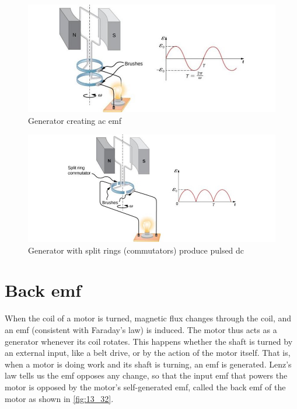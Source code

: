 \documentclass[14pt]{memoir}
\begin{document}
\begin{figure}[H]
\begin{center}
\includegraphics[scale=0.5]{fig/fig_13_29.jpg}
\caption{Generator creating ac emf}
\label{fig:13_29}
\end{center}
\end{figure}

\begin{figure}[H]
\begin{center}
\includegraphics[scale=0.5]{fig/fig_13_30.jpg}
\caption{Generator with split rings (commutators) produce pulsed dc}
\label{fig:13_30}
\end{center}
\end{figure}

\section{Back emf}

When the coil of a motor is turned, magnetic flux changes through the coil, and an emf (consistent with Faraday’s law) is induced. The motor thus acts as a generator whenever its coil rotates. This happens whether the shaft is turned by an external input, like a belt drive, or by the action of the motor itself. That is, when a motor is doing work and its shaft is turning, an emf is generated. Lenz’s law tells us the emf opposes any change, so that the input emf that powers the motor is opposed by the motor’s self-generated emf, called the back emf of the motor as shown in \ref{fig:13_32}.
\end{document}

